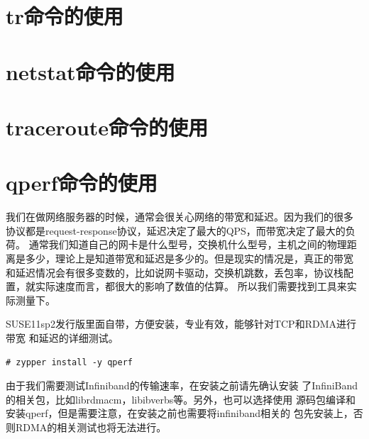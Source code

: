 \section{tr命令的使用}
\label{sec:trCmd}











\section{netstat命令的使用}
\label{sec:netstatCmd}



\section{traceroute命令的使用}
\label{sec:tracerouteCmd}







\section{qperf命令的使用}
\label{sec:qperfCmd}

我们在做网络服务器的时候，通常会很关心网络的带宽和延迟。因为我们的很多
协议都是request-response协议，延迟决定了最大的QPS，而带宽决定了最大的负
荷。 通常我们知道自己的网卡是什么型号，交换机什么型号，主机之间的物理距
离是多少，理论上是知道带宽和延迟是多少的。但是现实的情况是，真正的带宽
和延迟情况会有很多变数的，比如说网卡驱动，交换机跳数，丢包率，协议栈配
置，就实际速度而言，都很大的影响了数值的估算。 所以我们需要找到工具来实
际测量下。

SUSE11sp2发行版里面自带，方便安装，专业有效，能够针对TCP和RDMA进行带宽
和延迟的详细测试。

\begin{verbatim}
# zypper install -y qperf
\end{verbatim}

由于我们需要测试Infiniband的传输速率，在安装之前请先确认安装
了InfiniBand的相关包，比如librdmacm，libibverbs等。另外，也可以选择使用
源码包编译和安装qperf，但是需要注意，在安装之前也需要将infiniband相关的
包先安装上，否则RDMA的相关测试也将无法进行。

